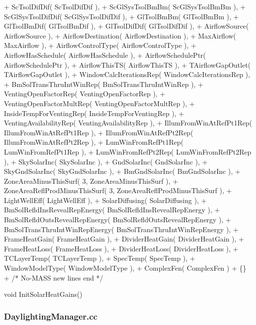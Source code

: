 \begin{DoxyCode}
+           ScTsolDifDif( ScTsolDifDif ),
+           ScGlSysTsolBmBm( ScGlSysTsolBmBm ),
+           ScGlSysTsolDifDif( ScGlSysTsolDifDif ),
+           GlTsolBmBm( GlTsolBmBm ),
+           GlTsolBmDif( GlTsolBmDif ),
+           GlTsolDifDif( GlTsolDifDif ),
+           AirflowSource( AirflowSource ),
+           AirflowDestination( AirflowDestination ),
+           MaxAirflow( MaxAirflow ),
+           AirflowControlType( AirflowControlType ),
+           AirflowHasSchedule( AirflowHasSchedule ),
+           AirflowSchedulePtr( AirflowSchedulePtr ),
+           AirflowThisTS( AirflowThisTS ),
+           TAirflowGapOutlet( TAirflowGapOutlet ),
+           WindowCalcIterationsRep( WindowCalcIterationsRep ),
+           BmSolTransThruIntWinRep( BmSolTransThruIntWinRep ),
+           VentingOpenFactorRep( VentingOpenFactorRep ),
+           VentingOpenFactorMultRep( VentingOpenFactorMultRep ),
+           InsideTempForVentingRep( InsideTempForVentingRep ),
+           VentingAvailabilityRep( VentingAvailabilityRep ),
+           IllumFromWinAtRefPt1Rep( IllumFromWinAtRefPt1Rep ),
+           IllumFromWinAtRefPt2Rep( IllumFromWinAtRefPt2Rep ),
+           LumWinFromRefPt1Rep( LumWinFromRefPt1Rep ),
+           LumWinFromRefPt2Rep( LumWinFromRefPt2Rep ),
+           SkySolarInc( SkySolarInc ),
+           GndSolarInc( GndSolarInc ),
+           SkyGndSolarInc( SkyGndSolarInc ),
+           BmGndSolarInc( BmGndSolarInc ),
+           ZoneAreaMinusThisSurf( 3, ZoneAreaMinusThisSurf ),
+           ZoneAreaReflProdMinusThisSurf( 3, ZoneAreaReflProdMinusThisSurf ),
+           LightWellEff( LightWellEff ),
+           SolarDiffusing( SolarDiffusing ),
+           BmSolRefldInsRevealRepEnergy( BmSolRefldInsRevealRepEnergy ),
+           BmSolRefldOutsRevealRepEnergy( BmSolRefldOutsRevealRepEnergy ),
+           BmSolTransThruIntWinRepEnergy( BmSolTransThruIntWinRepEnergy ),
+           FrameHeatGain( FrameHeatGain ),
+           DividerHeatGain( DividerHeatGain ),
+           FrameHeatLoss( FrameHeatLoss ),
+           DividerHeatLoss( DividerHeatLoss ),
+           TCLayerTemp( TCLayerTemp ),
+           SpecTemp( SpecTemp ),
+           WindowModelType( WindowModelType ),
+           ComplexFen( ComplexFen )
+       \{\}
+       /* No-MASS new lines end */

        void
        InitSolarHeatGains()
\end{DoxyCode}




 

\subsubsection*{Daylighting\+Manager.\+cc}




